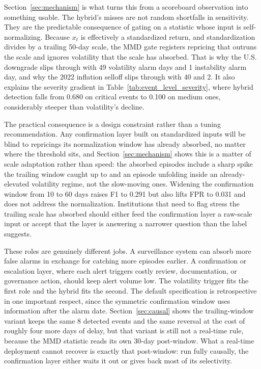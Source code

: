\documentclass[pdflatex,sn-mathphys-num,iicol]{sn-jnl}
\begin{document}
Section~\ref{sec:mechanism} is what turns this from a scoreboard observation into something usable. The hybrid's misses are not random shortfalls in sensitivity. They are the predictable consequence of gating on a statistic whose input is self-normalizing. Because $x_t$ is effectively a standardized return, and standardization divides by a trailing 50-day scale, the MMD gate registers repricing that outruns the scale and ignores volatility that the scale has absorbed. That is why the U.S. downgrade slips through with 49 volatility alarm days and 1 instability alarm day, and why the 2022 inflation selloff slips through with 40 and 2. It also explains the severity gradient in Table~\ref{tab:event_level_severity}, where hybrid detection falls from 0.680 on critical events to 0.100 on medium ones, considerably steeper than volatility's decline.

The practical consequence is a design constraint rather than a tuning recommendation. Any confirmation layer built on standardized inputs will be blind to repricings its normalization window has already absorbed, no matter where the threshold sits, and Section~\ref{sec:mechanism} shows this is a matter of scale adaptation rather than speed: the absorbed episodes include a sharp spike the trailing window caught up to and an episode unfolding inside an already-elevated volatility regime, not the slow-moving ones. Widening the confirmation window from 10 to 60 days raises F1 to 0.291 but also lifts FPR to 0.031 and does not address the normalization. Institutions that need to flag stress the trailing scale has absorbed should either feed the confirmation layer a raw-scale input or accept that the layer is answering a narrower question than the label suggests.

These roles are genuinely different jobs. A surveillance system can absorb more false alarms in exchange for catching more episodes earlier. A confirmation or escalation layer, where each alert triggers costly review, documentation, or governance action, should keep alert volume low. The volatility trigger fits the first role and the hybrid fits the second. The default specification is retrospective in one important respect, since the symmetric confirmation window uses information after the alarm date. Section~\ref{sec:causal} shows the trailing-window variant keeps the same 8 detected events and the same reversal at the cost of roughly four more days of delay, but that variant is still not a real-time rule, because the MMD statistic reads its own 30-day post-window. What a real-time deployment cannot recover is exactly that post-window: run fully causally, the confirmation layer either waits it out or gives back most of its selectivity.
\end{document}
